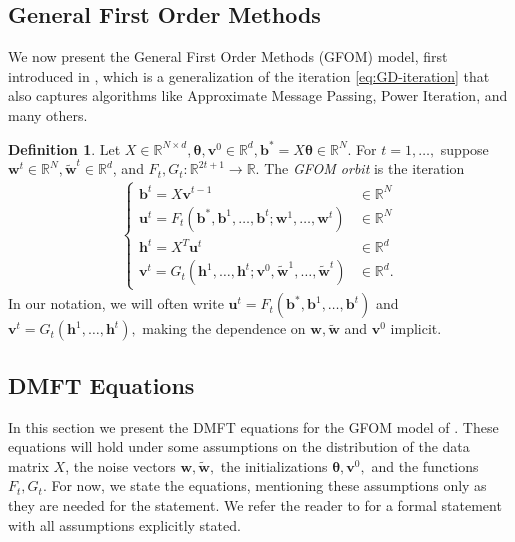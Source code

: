 \documentclass{article}
\newcommand{\1}{\mathbbm{1}}
\theoremstyle{plain}
\theoremstyle{definition}
\newtheorem{definition}[theorem]{Definition}
\theoremstyle{remark}
\newcommand{\bfu}{\boldsymbol{u}}
\newcommand{\bfv}{\boldsymbol{v}}
\newcommand{\bfh}{\boldsymbol{h}}
\newcommand{\bfb}{\boldsymbol{b}}
\newcommand{\bftheta}{\boldsymbol{\theta}}
\newcommand{\bfw}{\boldsymbol{w}}
\newcommand{\R}{\mathbb{R}}
\begin{document}
\subsection{General First Order Methods}
We now present the General First Order Methods (GFOM) model, first introduced in \cite{celentano2020estimation}, which is a generalization of the iteration \eqref{eq:GD-iteration} that also captures algorithms like Approximate Message Passing, Power Iteration, and many others.
\begin{definition}\label{defn:GFOM}
    Let $X \in \R^{N\times d}, \bftheta, \bfv^0 \in \R^d,\bfb^* = X\bftheta \in \R^N.$ For $t=1,\dots,$ suppose $\bfw^t \in \R^N, \tilde{\bfw}^t \in \R^d$, and $F_t, G_t:\R^{2t + 1}\to \R$. The \emph{GFOM orbit} is the iteration
    \begin{align}\label{eq:GFOM-orbit}
        \begin{cases}
            \bfb^t = X \bfv^{t-1} &\in \R^N \\
            \bfu^t = F_t(\bfb^*, \bfb^1,\dots,\bfb^t; \bfw^1,\dots,\bfw^t) & \in \R^N \\
            \bfh^t = X^T \bfu^t &\in \R^d \\
            \bfv^t = G_t(\bfh^1,\dots,\bfh^t;\bfv^0,\tilde{\bfw}^1, \dots, \tilde{\bfw}^t) & \in \R^d.
        \end{cases}
    \end{align}
    In our notation, we will often write $\bfu^t = F_t(\bfb^*, \bfb^1,\dots,\bfb^t)$ and $\bfv^t = G_t(\bfh^1,\dots,\bfh^t),$ making the dependence on $\bfw,\tilde{\bfw}$ and $\bfv^0$ implicit.
\end{definition}

\subsection{DMFT Equations}\label{sec:dmft-equations}
In this section we present the DMFT equations for the GFOM model of . These equations will hold under some assumptions on the distribution of the data matrix $X$, the noise vectors $\bfw,\tilde{\bfw},$ the initializations $\bftheta,\bfv^0,$ and the functions $F_t,G_t.$ For now, we state the equations, mentioning these assumptions only as they are needed for the statement. We refer the reader to  for a formal statement with all assumptions explicitly stated.
\end{document}
